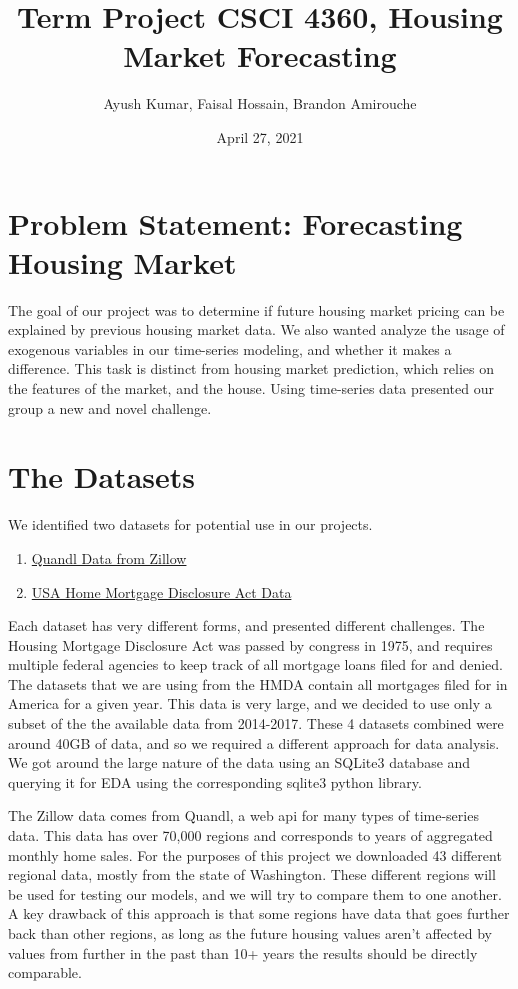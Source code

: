 \documentclass{article}
\title{Term Project CSCI 4360, Housing Market Forecasting}
\author{Ayush Kumar, Faisal Hossain, Brandon Amirouche}
\date{April 27, 2021}
\begin{document}
	\maketitle
	\tableofcontents
	\newpage
	
	\section{Problem Statement: Forecasting Housing Market}
	
	The goal of our project was to determine if future housing market pricing can be explained by 
	previous housing market data. We also wanted analyze the usage of exogenous variables in our time-series 
	modeling, and whether it makes a difference. This task is distinct from housing market prediction, which 
	relies on the features of the market, and the house. Using time-series data presented our group a new 
	and novel challenge. 
	
	\section{The Datasets}
	
	We identified two datasets for potential use in our projects. 
	
	\begin{enumerate}
		\item  \href{https://www.quandl.com/databases/ZILLOW/data}{Quandl Data from Zillow}
		\item \href{https://www.consumerfinance.gov/data-research/hmda/historic-data/?geo=nationwide&records=all-records&field_descriptions=labels}{USA Home Mortgage Disclosure Act Data}
	\end{enumerate}

	Each dataset has very different forms, and presented different challenges. The Housing Mortgage Disclosure Act was passed 
	by congress in 1975, and requires multiple federal agencies to keep track of all mortgage loans filed for and 
	denied. The datasets that we are using from the HMDA contain all mortgages filed for in America for a given year. 
	This data is very large, and we decided to use only a subset of the the available data from 2014-2017. These 
	4 datasets combined were around 40GB of data, and so we required a different approach for data analysis. We 
	got around the large nature of the data using an SQLite3 database and querying it for EDA using the corresponding 
	sqlite3 python library. 
	
	The Zillow data comes from Quandl, a web api for many types of time-series data. This data has over 70,000 regions
	and corresponds to years of aggregated monthly home sales. For the purposes of this project we downloaded 43 different 
	regional data, mostly from the state of Washington. These different regions will be used for testing our models, and we will try 
	to compare them to one another. A key drawback of this approach is that some regions have data that goes further back 
	than other regions, as long as the future housing values aren't affected by values from further in the past than 10+ years
	the results should be directly comparable. 
	
\end{document}
